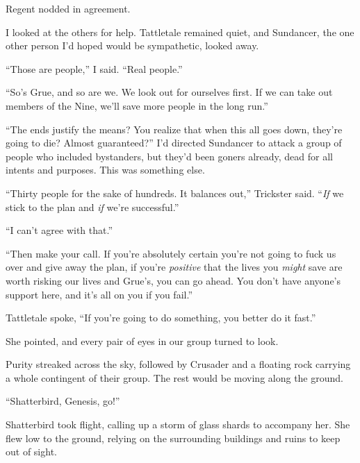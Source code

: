 Regent nodded in agreement.



I looked at the others for help.  Tattletale remained quiet, and Sundancer, the one other person I'd hoped would be sympathetic, looked away.



``Those are people,'' I said.  ``Real people.''



``So's Grue, and so are we.  We look out for ourselves first.  If we can take out members of the Nine, we'll save more people in the long run.''



``The ends justify the means?  You realize that when this all goes down, they're going to die?  Almost guaranteed?''  I'd directed Sundancer to attack a group of people who included bystanders, but they'd been goners already, dead for all intents and purposes.  This was something else.



``Thirty people for the sake of hundreds.  It balances out,'' Trickster said.  ``\emph{If} we stick to the plan and \emph{if} we're successful.''



``I can't agree with that.''



``Then make your call.  If you're absolutely certain you're not going to fuck us over and give away the plan, if you're \emph{positive} that the lives you \emph{might} save are worth risking our lives and Grue's, you can go ahead.  You don't have anyone's support here, and it's all on you if you fail.''



Tattletale spoke, ``If you're going to do something, you better do it fast.''



She pointed, and every pair of eyes in our group turned to look.



Purity streaked across the sky, followed by Crusader and a floating rock carrying a whole contingent of their group.  The rest would be moving along the ground.



``Shatterbird, Genesis, go!''



Shatterbird took flight, calling up a storm of glass shards to accompany her.  She flew low to the ground, relying on the surrounding buildings and ruins to keep out of sight.



